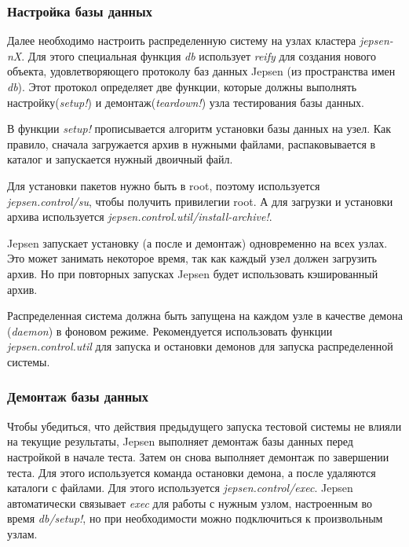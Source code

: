 \documentclass[14pt,  openany]{book}
\begin{document}
\subsubsection{Настройка базы данных}
Далее необходимо настроить распределенную систему на узлах кластера \textit{jepsen-nX}.  Для этого специальная функция \textit{db} использует \textit{reify} для создания нового объекта, удовлетворяющего протоколу баз данных Jepsen (из пространства имен \textit{db}).  Этот протокол определяет две функции, которые должны выполнять настройку(\textit{setup!}) и демонтаж(\textit{teardown!}) узла тестирования базы данных.
\par В функции \textit{setup!} прописывается алгоритм установки базы данных на узел. Как правило, сначала загружается архив в нужными файлами, распаковывается в каталог и запускается нужный двоичный файл.
\par Для установки пакетов нужно быть в  root,  поэтому используется \textit{jepsen.control/su}, чтобы получить привилегии root.  А для загрузки и установки архива используется \textit{jepsen.control.util/install-archive!}. 
\par  Jepsen запускает установку (а после и демонтаж) одновременно на всех узлах. Это может занимать некоторое время, так как каждый узел должен загрузить архив. Но при повторных запусках Jepsen будет использовать кэшированный архив.
\par Распределенная система должна быть запущена на каждом узле в качестве демона (\textit{daemon}) в фоновом режиме. Рекомендуется использовать функции \textit{jepsen.control.util} для запуска и остановки демонов для запуска распределенной системы.

\subsubsection{Демонтаж базы данных}
Чтобы убедиться, что действия предыдущего запуска тестовой системы не влияли на текущие результаты, Jepsen выполняет демонтаж базы данных перед настройкой в начале теста.  Затем он снова выполняет демонтаж по завершении теста.  Для этого используется команда остановки демона, а после удаляются каталоги с файлами. Для этого используется \textit{jepsen.control/exec}.  Jepsen автоматически связывает \textit{exec} для работы с нужным узлом, настроенным во время \textit{db/setup!}, но при необходимости  можно подключиться к произвольным узлам.
\end{document}
